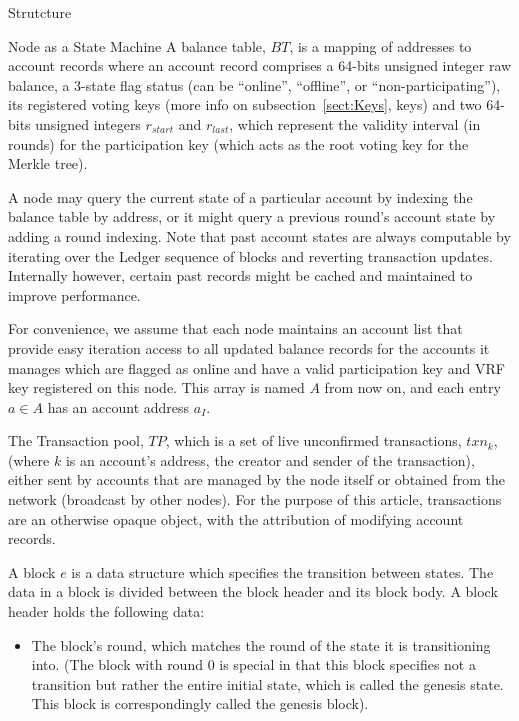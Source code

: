 \documentclass[10pt,a4paper]{article}
\begin{document}
\begin{section}{Strutcture}
\begin{subsection}{Node as a State Machine}
A {\sf balance table}, $BT$, is a mapping of addresses to 
account records where an {\sf account record} comprises 
 a 64-bits unsigned integer raw balance, 
 a 3-state flag status (can be ``online'', ``offline'', or ``non-participating''),
 its registered voting keys (more info on subsection~\ref{sect:Keys}, keys) and 
 two 64-bits unsigned integers $r_{start}$ and $r_{last}$, which represent the 
   validity interval (in rounds)
   for the participation key (which acts as the root voting key for the Merkle 
   tree).

A node may query the current state of a particular account by indexing the balance 
table by address, or it might query a previous round's account state by adding a 
round indexing. 
Note that past account states are always computable by iterating over the Ledger
sequence of blocks and reverting transaction updates. Internally however, certain
past records might be cached and maintained to improve performance.

For convenience, we assume that each node maintains an account list that provide 
easy iteration access to all updated balance records for the accounts it manages 
which are flagged as online and have a valid participation key and VRF key
registered on this node.
This array is named $A$ from now on, and each entry $a\in A$ has an account address 
$a_I$. %

The Transaction pool, $TP$, which is a set of live unconfirmed transactions, $txn_k$, (where 
$k$ is an account's address, the creator and sender of the transaction), either
sent by accounts that are managed by the node itself or obtained from the network 
(broadcast by other nodes).
For the purpose of this article, transactions are an otherwise opaque object, with the 
attribution of modifying account records.

A {\sf block} $e$ is a data structure which specifies the transition between states.
The data in a block is divided between the block header and its block body.
A block header holds the following data:
\begin{itemize}
    \item
    The block's round, which matches the round of the state it is transitioning
    into. (The block with round 0 is special in that this block specifies not
    a transition but rather the entire initial state, which is called the genesis
    state. This block is correspondingly called the genesis block).
    

\end{itemize}
\end{subsection}
\end{section}
\end{document}
